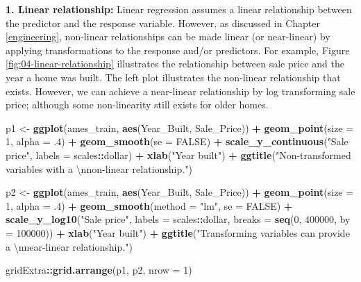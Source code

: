 \documentclass[]{krantz}
\makeatletter
\newenvironment{Shaded}{\begin{snugshade}}{\end{snugshade}}
\newcommand{\CharTok}[1]{\textcolor[rgb]{0.5,0.5,0.5}{#1}}
\newcommand{\DataTypeTok}[1]{\textcolor[rgb]{0.27,0.27,0.27}{#1}}
\newcommand{\DecValTok}[1]{\textcolor[rgb]{0.06,0.06,0.06}{#1}}
\newcommand{\FloatTok}[1]{\textcolor[rgb]{0.06,0.06,0.06}{#1}}
\newcommand{\KeywordTok}[1]{\textcolor[rgb]{0.27,0.27,0.27}{\textbf{#1}}}
\newcommand{\NormalTok}[1]{#1}
\newcommand{\OperatorTok}[1]{\textcolor[rgb]{0.43,0.43,0.43}{\textbf{#1}}}
\newcommand{\OtherTok}[1]{\textcolor[rgb]{0.37,0.37,0.37}{#1}}
\newcommand{\StringTok}[1]{\textcolor[rgb]{0.5,0.5,0.5}{#1}}
\newenvironment{kframe}{%
\medskip{}
\setlength{\fboxsep}{.8em}
 \def\at@end@of@kframe{}%
 \ifinner\ifhmode%
  \def\at@end@of@kframe{\end{minipage}}%
  \begin{minipage}{\columnwidth}%
 \fi\fi%
 \def\FrameCommand##1{\hskip\@totalleftmargin \hskip-\fboxsep
 \colorbox{shadecolor}{##1}\hskip-\fboxsep
     \hskip-\linewidth \hskip-\@totalleftmargin \hskip\columnwidth}%
 \MakeFramed {\advance\hsize-\width
   \@totalleftmargin\z@ \linewidth\hsize
   \@setminipage}}%
 {\par\unskip\endMakeFramed%
 \at@end@of@kframe}
\renewenvironment{Shaded}{\begin{kframe}}{\end{kframe}}
\makeatother
\begin{document}
\textbf{1. Linear relationship:} Linear regression assumes a linear relationship between the predictor and the response variable. However, as discussed in Chapter \ref{engineering}, non-linear relationships can be made linear (or near-linear) by applying transformations to the response and/or predictors. For example, Figure \ref{fig:04-linear-relationship} illustrates the relationship between sale price and the year a home was built. The left plot illustrates the non-linear relationship that exists. However, we can achieve a near-linear relationship by log transforming sale price; although some non-linearity still exists for older homes.

\begin{Shaded}
\begin{Highlighting}[]
\NormalTok{p1 <-}\StringTok{ }\KeywordTok{ggplot}\NormalTok{(ames_train, }\KeywordTok{aes}\NormalTok{(Year_Built, Sale_Price)) }\OperatorTok{+}\StringTok{ }
\StringTok{  }\KeywordTok{geom_point}\NormalTok{(}\DataTypeTok{size =} \DecValTok{1}\NormalTok{, }\DataTypeTok{alpha =} \FloatTok{.4}\NormalTok{) }\OperatorTok{+}
\StringTok{  }\KeywordTok{geom_smooth}\NormalTok{(}\DataTypeTok{se =} \OtherTok{FALSE}\NormalTok{) }\OperatorTok{+}
\StringTok{  }\KeywordTok{scale_y_continuous}\NormalTok{(}\StringTok{"Sale price"}\NormalTok{, }\DataTypeTok{labels =}\NormalTok{ scales}\OperatorTok{::}\NormalTok{dollar) }\OperatorTok{+}
\StringTok{  }\KeywordTok{xlab}\NormalTok{(}\StringTok{"Year built"}\NormalTok{) }\OperatorTok{+}
\StringTok{  }\KeywordTok{ggtitle}\NormalTok{(}\StringTok{"Non-transformed variables with a }\CharTok{\textbackslash{}n}\StringTok{non-linear relationship."}\NormalTok{)}

\NormalTok{p2 <-}\StringTok{ }\KeywordTok{ggplot}\NormalTok{(ames_train, }\KeywordTok{aes}\NormalTok{(Year_Built, Sale_Price)) }\OperatorTok{+}\StringTok{ }
\StringTok{  }\KeywordTok{geom_point}\NormalTok{(}\DataTypeTok{size =} \DecValTok{1}\NormalTok{, }\DataTypeTok{alpha =} \FloatTok{.4}\NormalTok{) }\OperatorTok{+}\StringTok{ }
\StringTok{  }\KeywordTok{geom_smooth}\NormalTok{(}\DataTypeTok{method =} \StringTok{"lm"}\NormalTok{, }\DataTypeTok{se =} \OtherTok{FALSE}\NormalTok{) }\OperatorTok{+}
\StringTok{  }\KeywordTok{scale_y_log10}\NormalTok{(}\StringTok{"Sale price"}\NormalTok{, }\DataTypeTok{labels =}\NormalTok{ scales}\OperatorTok{::}\NormalTok{dollar, }
                \DataTypeTok{breaks =} \KeywordTok{seq}\NormalTok{(}\DecValTok{0}\NormalTok{, }\DecValTok{400000}\NormalTok{, }\DataTypeTok{by =} \DecValTok{100000}\NormalTok{)) }\OperatorTok{+}
\StringTok{  }\KeywordTok{xlab}\NormalTok{(}\StringTok{"Year built"}\NormalTok{) }\OperatorTok{+}
\StringTok{  }\KeywordTok{ggtitle}\NormalTok{(}\StringTok{"Transforming variables can provide a }\CharTok{\textbackslash{}n}\StringTok{near-linear relationship."}\NormalTok{)}

\NormalTok{gridExtra}\OperatorTok{::}\KeywordTok{grid.arrange}\NormalTok{(p1, p2, }\DataTypeTok{nrow =} \DecValTok{1}\NormalTok{)}
\end{Highlighting}
\end{Shaded}
\end{document}
